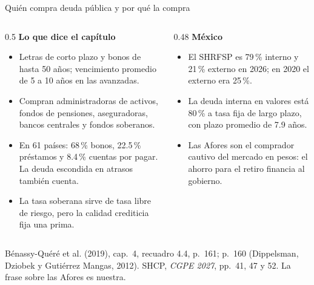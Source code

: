 \documentclass[aspectratio=169,11pt]{beamer}
\newcommand{\fuente}[1]{\par\vfill{\small\color{cGris}#1\par}}
\newcommand{\BQ}{Bénassy-Quéré et al. (2019), cap.~4}
\begin{document}
\begin{frame}{Quién compra deuda pública y por qué la compra}
  \begin{columns}[T]
    \begin{column}{0.5\textwidth}
      \small
      \textbf{Lo que dice el capítulo}
      \begin{itemize}
        \item Letras de corto plazo y bonos de hasta 50 años; vencimiento promedio de 5 a 10 años en las avanzadas.
        \item Compran administradoras de activos, fondos de pensiones, aseguradoras, bancos centrales y fondos soberanos.
        \item En 61 países: 68\,\% bonos, 22.5\,\% préstamos y 8.4\,\% cuentas por pagar. La deuda escondida en atrasos también cuenta.
        \item La tasa soberana sirve de tasa libre de riesgo, pero la calidad crediticia fija una prima.
      \end{itemize}
    \end{column}
    \begin{column}{0.48\textwidth}
      \small
      \textbf{México}
      \begin{itemize}
        \item El SHRFSP es 79\,\% interno y 21\,\% externo en 2026; en 2020 el externo era 25\,\%.
        \item La deuda interna en valores está 80\,\% a tasa fija de largo plazo, con plazo promedio de 7.9 años.
        \item Las Afores son el comprador cautivo del mercado en pesos: el ahorro para el retiro financia al gobierno.
      \end{itemize}
    \end{column}
  \end{columns}
  \fuente{\BQ, recuadro 4.4, p.~161; p.~160 (Dippelsman, Dziobek y Gutiérrez Mangas, 2012). SHCP, \emph{CGPE 2027}, pp.~41, 47 y 52. La frase sobre las Afores es nuestra.}
\end{frame}
\end{document}
